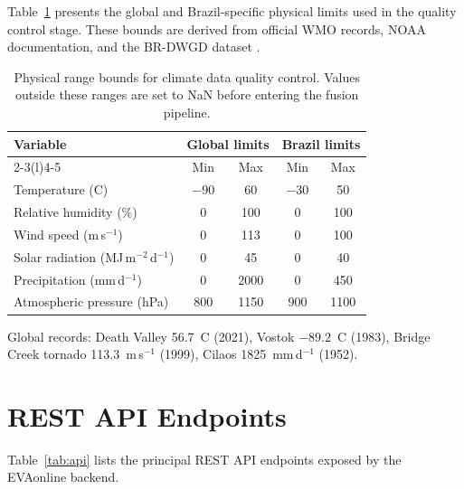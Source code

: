 \documentclass[preprint,review,12pt]{elsarticle}
\begin{document}
Table~\ref{tab:limits_global} presents the global and Brazil-specific physical
limits used in the quality control stage. These bounds are derived from official
WMO records, NOAA documentation, and the BR-DWGD dataset
\citep{Xavier2016, Xavier2022}.

\begin{table}[htbp]
\centering
\caption{Physical range bounds for climate data quality control. Values outside
these ranges are set to NaN before entering the fusion pipeline.}
\label{tab:limits_global}
\small
\begin{tabular}{@{}lcccc@{}}
\toprule
\multirow{2}{*}{Variable} & \multicolumn{2}{c}{Global limits} & \multicolumn{2}{c}{Brazil limits} \\
\cmidrule(lr){2-3}\cmidrule(l){4-5}
 & Min & Max & Min & Max \\
\midrule
Temperature (\textdegree{}C) & $-90$ & 60 & $-30$ & 50 \\
Relative humidity (\%) & 0 & 100 & 0 & 100 \\
Wind speed (m\,s$^{-1}$) & 0 & 113 & 0 & 100 \\
Solar radiation (MJ\,m$^{-2}$\,d$^{-1}$) & 0 & 45 & 0 & 40 \\
Precipitation (mm\,d$^{-1}$) & 0 & 2000 & 0 & 450 \\
Atmospheric pressure (hPa) & 800 & 1150 & 900 & 1100 \\
\bottomrule
\end{tabular}
\begin{flushleft}
\small Global records: Death Valley 56.7~\textdegree{}C (2021), Vostok
$-89.2$~\textdegree{}C (1983), Bridge Creek tornado 113.3~m\,s$^{-1}$
(1999), Cilaos 1825~mm\,d$^{-1}$ (1952).
\end{flushleft}
\end{table}


\section{REST API Endpoints}
\label{app:api}

Table~\ref{tab:api} lists the principal REST API endpoints exposed by the
EVAonline backend.
\end{document}
